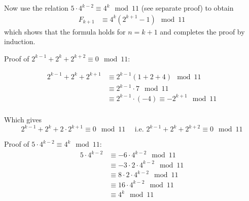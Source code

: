 \documentclass[11pt]{amsart}
\begin{document}
Now use the relation $5 \cdot 4^{k-2} \equiv 4^{k} \mod 11$ (see separate proof) to obtain
$$
\begin{aligned}
F_{k+1} 
&\equiv 
4^{k} 
\left(
2^{k+1}  - 1
\right)
\mod 11
\end{aligned}
$$
which shows that the formula holds for $n=k+1$ and completes the proof by induction.


\vspace{2em}

Proof of $2^{k-1} + 2^{k} + 2^{k+2} \equiv 0 \mod 11 $:

$$
\begin{aligned}
2^{k-1} + 2^{k} + 2^{k+1} 
& \equiv 
2^{k-1} (1 + 2 + 4) \mod 11
\\
& \equiv 
2^{k-1} \cdot 7 \mod 11
\\
& \equiv 
2^{k-1} \cdot (-4) \equiv - 2^{k+1}\mod 11
\\
\end{aligned}
$$

Which gives 
$$
2^{k-1} + 2^{k} + 2 \cdot 2^{k+1} \equiv 0 \mod 11
\quad \text{ i.e. }
2^{k-1} + 2^{k} + 2^{k+2} \equiv 0 \mod 11
$$



\vspace{2em}

Proof of $5 \cdot 4^{k-2} \equiv 4^{k} \mod 11$:
$$
\begin{aligned}
5 \cdot 4^{k-2} 
& \equiv
- 6 \cdot 4^{k-2} \mod 11
\\
&\equiv
- 3 \cdot 2 \cdot 4^{k-2} \mod 11
\\
&\equiv
8 \cdot 2 \cdot 4^{k-2} \mod 11
\\
&\equiv
16 \cdot 4^{k-2} \mod 11
\\
&\equiv
4^{k} \mod 11
\end{aligned}
$$
\end{document}
